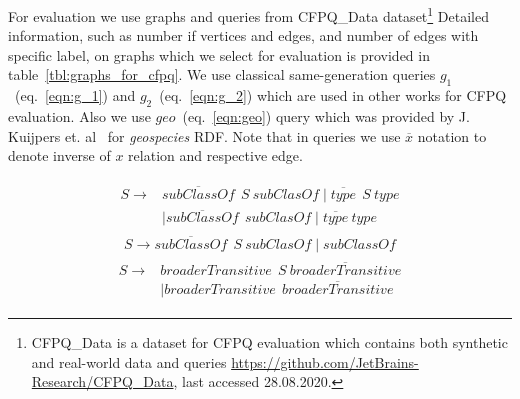 For evaluation we use graphs and queries from CFPQ\_Data dataset\footnote{CFPQ\_Data is a dataset for CFPQ evaluation which contains both synthetic and real-world data and queries \url{https://github.com/JetBrains-Research/CFPQ\_Data}, last accessed 28.08.2020.}
Detailed information, such as number if vertices and edges, and number of edges with specific label, on graphs which we select for evaluation is provided in table~\ref{tbl:graphs_for_cfpq}.
We use classical same-generation queries $g_1$~(eq.~\ref{eqn:g_1}) and $g_2$~(eq.~\ref{eqn:g_2}) which are used in other works for CFPQ evaluation. 
Also we use $geo$~(eq.~\ref{eqn:geo}) query which was provided by J. Kuijpers et. al~\cite{Kuijpers:2019:ESC:3335783.3335791} for \textit{geospecies} RDF.
Note that in queries we use $\overline{x}$ notation to denote inverse of $x$ relation and respective edge.

\begin{align}
\begin{split}
\label{eqn:g_1}
S \to & \overline{\textit{subClassOf}} \ \ S \ \textit{subClasOf} \mid \overline{\textit{type}} \ \ S \ \textit{type}\\   & \mid \overline{\textit{subClassOf}} \ \ \textit{subClasOf} \mid \overline{\textit{type}} \ \textit{type}
\end{split}
\end{align}
\begin{align}
\label{eqn:g_2}
S \to \overline{\textit{subClassOf}} \ \ S \ \textit{subClasOf} \mid \textit{subClassOf}
\end{align}
\begin{align}
\begin{split}
\label{eqn:geo}
S \to & \textit{broaderTransitive} \ \  S \ \overline{\textit{broaderTransitive}} \\
      & \mid \textit{broaderTransitive} \ \  \overline{\textit{broaderTransitive}}
\end{split}
\end{align}

